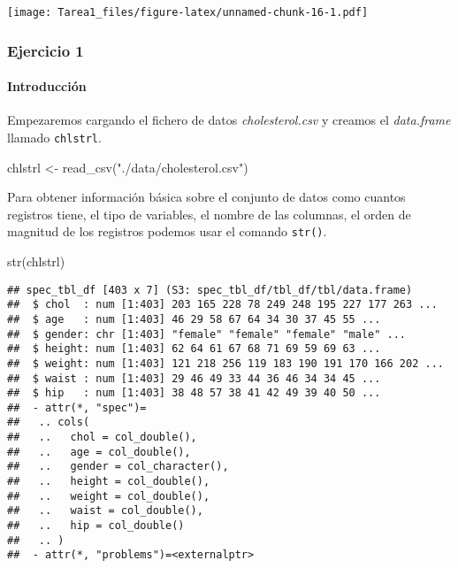 \documentclass[
]{article}
\newenvironment{Shaded}{\begin{snugshade}}{\end{snugshade}}
\newcommand{\FunctionTok}[1]{\textcolor[rgb]{0.00,0.00,0.00}{#1}}
\newcommand{\NormalTok}[1]{#1}
\newcommand{\OtherTok}[1]{\textcolor[rgb]{0.56,0.35,0.01}{#1}}
\newcommand{\StringTok}[1]{\textcolor[rgb]{0.31,0.60,0.02}{#1}}
\begin{document}
\texttt{[image: Tarea1\_files/figure-latex/unnamed-chunk-16-1.pdf]}

\hypertarget{ejercicio-1}{%
\subsubsection{Ejercicio 1}\label{ejercicio-1}}

\hypertarget{introducciuxf3n}{%
\paragraph{Introducción}\label{introducciuxf3n}}

Empezaremos cargando el fichero de datos \emph{cholesterol.csv} y
creamos el \emph{data.frame} llamado \texttt{chlstrl}.

\begin{Shaded}
\begin{Highlighting}[]
\NormalTok{chlstrl }\OtherTok{\textless{}{-}} \FunctionTok{read\_csv}\NormalTok{(}\StringTok{"./data/cholesterol.csv"}\NormalTok{)}
\end{Highlighting}
\end{Shaded}

Para obtener información básica sobre el conjunto de datos como cuantos
registros tiene, el tipo de variables, el nombre de las columnas, el
orden de magnitud de los registros podemos usar el comando
\texttt{str()}.

\begin{Shaded}
\begin{Highlighting}[]
\FunctionTok{str}\NormalTok{(chlstrl)}
\end{Highlighting}
\end{Shaded}

\begin{verbatim}
## spec_tbl_df [403 x 7] (S3: spec_tbl_df/tbl_df/tbl/data.frame)
##  $ chol  : num [1:403] 203 165 228 78 249 248 195 227 177 263 ...
##  $ age   : num [1:403] 46 29 58 67 64 34 30 37 45 55 ...
##  $ gender: chr [1:403] "female" "female" "female" "male" ...
##  $ height: num [1:403] 62 64 61 67 68 71 69 59 69 63 ...
##  $ weight: num [1:403] 121 218 256 119 183 190 191 170 166 202 ...
##  $ waist : num [1:403] 29 46 49 33 44 36 46 34 34 45 ...
##  $ hip   : num [1:403] 38 48 57 38 41 42 49 39 40 50 ...
##  - attr(*, "spec")=
##   .. cols(
##   ..   chol = col_double(),
##   ..   age = col_double(),
##   ..   gender = col_character(),
##   ..   height = col_double(),
##   ..   weight = col_double(),
##   ..   waist = col_double(),
##   ..   hip = col_double()
##   .. )
##  - attr(*, "problems")=<externalptr>
\end{verbatim}
\end{document}
